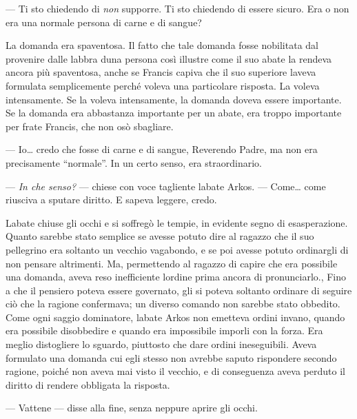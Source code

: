 --- Ti sto chiedendo di \emph{non} supporre. Ti sto chiedendo di essere
sicuro. Era o non era una normale persona di carne e di sangue?

La domanda era spaventosa. Il fatto che tale domanda fosse nobilitata
dal provenire dalle labbra d\textquotesingle una persona così illustre
come il suo abate la rendeva ancora più spaventosa, anche se Francis
capiva che il suo superiore l\textquotesingle aveva formulata
semplicemente perché voleva una particolare risposta. La voleva
intensamente. Se la voleva intensamente, la domanda doveva essere
importante. Se la domanda era abbastanza importante per un abate, era
troppo importante per frate Francis, che non osò sbagliare.

--- Io\ldots{} credo che fosse di carne e di sangue, Reverendo Padre, ma
non era precisamente ``normale''. In un certo senso, era straordinario.

--- \emph{In che senso?} --- chiese con voce tagliente
l\textquotesingle abate Arkos. --- Come\ldots{} come riusciva a sputare
diritto. E sapeva leggere, credo.

L\textquotesingle abate chiuse gli occhi e si soffregò le tempie, in
evidente segno di esasperazione. Quanto sarebbe stato semplice se avesse
potuto dire al ragazzo che il suo pellegrino era soltanto un vecchio
vagabondo, e se poi avesse potuto ordinargli di non pensare altrimenti.
Ma, permettendo al ragazzo di capire che era possibile una domanda,
aveva reso inefficiente l\textquotesingle ordine prima ancora di
pronunciarlo., Fino a che il pensiero poteva essere governato, gli si
poteva soltanto ordinare di seguire ciò che la ragione confermava; un
diverso comando non sarebbe stato obbedito. Come ogni saggio dominatore,
l\textquotesingle abate Arkos non emetteva ordini invano, quando era
possibile disobbedire e quando era impossibile imporli con la forza. Era
meglio distogliere lo sguardo, piuttosto che dare ordini ineseguibili.
Aveva formulato una domanda cui egli stesso non avrebbe saputo
rispondere secondo ragione, poiché non aveva mai visto il vecchio, e di
conseguenza aveva perduto il diritto di rendere obbligata la risposta.

--- Vattene --- disse alla fine, senza neppure aprire gli occhi.
